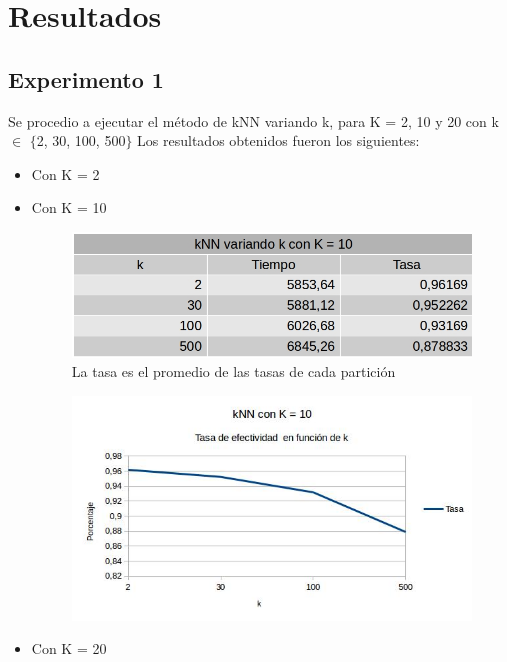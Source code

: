\section{Resultados}



\subsection{Experimento 1}
Se procedio a ejecutar el método de kNN variando k, para K = 2, 10 y 20 con k $\in$ $\{$2, 30, 100, 500$\}$ 
Los resultados obtenidos fueron los siguientes:
\begin{itemize}
\item Con K = 2\\
\item Con K = 10\\
    \begin{figure}[H]
    \centering
    \includegraphics[scale=0.5]{Tablas/kNNK10.jpg}\caption{La tasa es el promedio de las tasas de cada partición}
    \end{figure}

    \begin{figure}[H]
    \centering
    \includegraphics[scale=0.7]{Graficos/graficoknnK10.jpg}
    \end{figure}

\item Con K = 20\\
\end{itemize}

